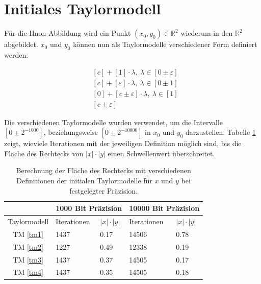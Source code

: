  
 \section{Initiales Taylormodell}
 
 Für die H\e non-Abbildung wird ein Punkt $(x_0,y_0) \in \mathbb{R}^2$ wiederum in den $\mathbb{R}^2$ abgebildet. $x_0$ und $y_0$ können nun als Taylormodelle verschiedener Form definiert werden:
 
 
 \begin{align}
  &[c] + [1] \cdot \lambda,\  \lambda \in [0 \pm \varepsilon] \label{tm1}\\
  &[c] + [\varepsilon] \cdot \lambda,\ \lambda \in [0 \pm 1] \label{tm2}\\
  &[0] + [c \pm \varepsilon] \cdot \lambda,\ \lambda \in [1] \label{tm3}\\
  &[c \pm \varepsilon]\label{tm4} 
 \end{align}


Die verschiedenen Taylormodelle wurden verwendet, um die Intervalle $[0 \pm 2^{-1000}]$, beziehungsweise $[0\pm 2^{-10000}]$ in $x_0$ und $y_0$ darzustellen. Tabelle \ref{tab:tm} zeigt, wieviele Iterationen mit der jeweiligen Definition möglich sind, bis die Fläche des Rechtecks von $|x|\cdot|y|$ einen Schwellenwert überschreitet.
 
 
\begin{table}[tbh]
\centering
\begin{tabular}{|c||l|l||l|l|}
\hline
&\multicolumn{2}{c||}{1000 Bit Präzision} & \multicolumn{2}{c|}{10000 Bit Präzision} \\
\hline
Taylormodell & Iterationen & $|x| \cdot |y|$ &Iterationen & $|x| \cdot |y|$\\
\hline
TM \ref{tm1} & 1437 & 0.17 &14506 & 0.78 \\ 
TM \ref{tm2}  & 1227 & 0.49&12338 & 0.19  \\
TM \ref{tm3} & 1437 &  0.37&14505 & 0.17  \\                                                                 
TM \ref{tm4}  & 1437 & 0.35 &14505 & 0.18  \\
\hline 
\end{tabular}

\caption[Experimentelle Taylormodell Varianten]{Berechnung der Fläche des Rechtecks mit verschiedenen Definitionen der initialen Taylormodelle für $x$ und $y$ bei festgelegter Präzision.}
\label{tab:tm}
\end{table}
 
